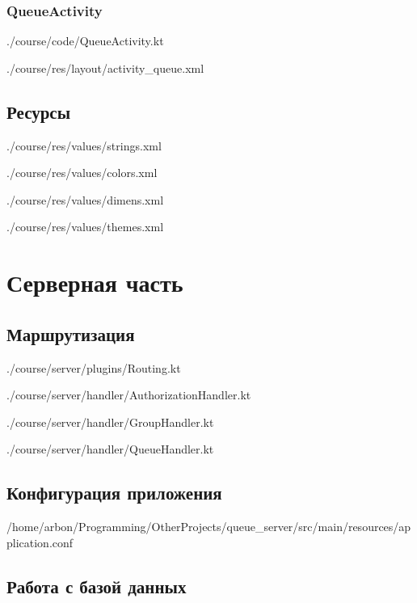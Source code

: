 \subsection{QueueActivity}\label{lst:activity:queue}

{./course/code/QueueActivity.kt}

{./course/res/layout/activity_queue.xml}

\section{Ресурсы}

{./course/res/values/strings.xml}

{./course/res/values/colors.xml}

{./course/res/values/dimens.xml}

{./course/res/values/themes.xml}

\chapter{Серверная часть}

\section{Маршрутизация}\label{lst:routing}

{./course/server/plugins/Routing.kt}

{./course/server/handler/AuthorizationHandler.kt}

{./course/server/handler/GroupHandler.kt}

{./course/server/handler/QueueHandler.kt}

\section{Конфигурация приложения}\label{lst:config}

{/home/arbon/Programming/OtherProjects/queue_server/src/main/resources/application.conf}

\section{Работа с базой данных}

